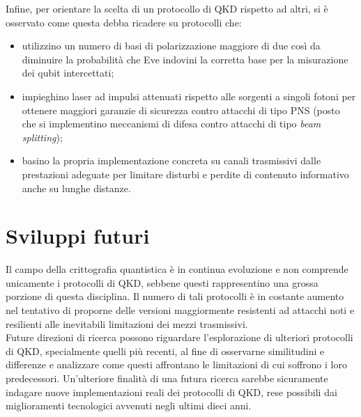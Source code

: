 Infine, per orientare la scelta di un protocollo di QKD rispetto ad altri, si è osservato come questa debba ricadere su protocolli che:
\begin{itemize}
    \item utilizzino un numero di basi di polarizzazione maggiore di due così da diminuire la probabilità che Eve indovini la corretta base per la misurazione dei qubit intercettati;
    \item impieghino laser ad impulsi attenuati rispetto alle sorgenti a singoli fotoni per ottenere maggiori garanzie di sicurezza contro attacchi di tipo PNS (posto che si implementino meccanismi di difesa contro attacchi di tipo \textit{beam splitting});
    \item basino la propria implementazione concreta su canali trasmissivi dalle prestazioni adeguate per limitare disturbi e perdite di contenuto informativo anche su lunghe distanze.
\end{itemize}

\section{Sviluppi futuri}
Il campo della crittografia quantistica è in continua evoluzione e non comprende unicamente i protocolli di QKD, sebbene questi rappresentino una grossa porzione di questa disciplina. Il numero di tali protocolli è in costante aumento nel tentativo di proporne delle versioni maggiormente resistenti ad attacchi noti e resilienti alle inevitabili limitazioni dei mezzi trasmissivi. \\
Future direzioni di ricerca possono riguardare l'esplorazione di ulteriori protocolli di QKD, specialmente quelli più recenti, al fine di osservarne similitudini e differenze e analizzare come questi affrontano le limitazioni di cui soffrono i loro predecessori. Un'ulteriore finalità di una futura ricerca sarebbe sicuramente indagare nuove implementazioni reali dei protocolli di QKD, rese possibili dai miglioramenti tecnologici avvenuti negli ultimi dieci anni.